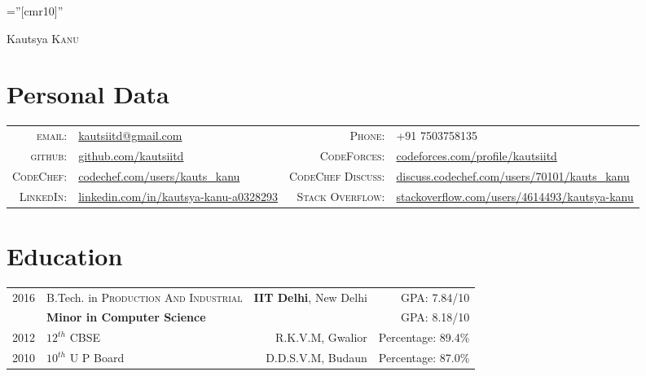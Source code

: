 \documentclass[a4paper,10pt]{article}
\begin{document}

\pagestyle{empty} %

\font\fb=''[cmr10]'' %

\par{
		{\Huge Kautsya \textsc{Kanu}
	}\bigskip\par}

\section{Personal Data}

\begin{tabular}{rl rl}
    \textsc{email:}     & \href{mailto:kautsiitd@gmail.com}{kautsiitd@gmail.com} & \textsc{Phone:}     & +91 7503758135\\
    \textsc{github:}     & \href{https://github.com/kautsiitd}{github.com/kautsiitd} & \textsc{CodeForces:}     & \href{http://codeforces.com/profile/kautsiitd}{codeforces.com/profile/kautsiitd}\\
     \textsc{CodeChef:}     & \href{https://www.codechef.com/users/kauts\_kanu}{codechef.com/users/kauts\_kanu} & \textsc{CodeChef Discuss:}     & \href{https://discuss.codechef.com/users/70101/kauts\_kanu}{discuss.codechef.com/users/70101/kauts\_kanu}\\
    \textsc{LinkedIn:}     & \href{https://www.linkedin.com/in/kautsya-kanu-a0328293}{linkedin.com/in/kautsya-kanu-a0328293} & \textsc{Stack Overflow:}     & \href{https://stackoverflow.com/users/4614493/kautsya-kanu?tab=profile}{stackoverflow.com/users/4614493/kautsya-kanu}\\
\end{tabular}

\section{Education}
\begin{tabular*}{\textwidth}{c @{\extracolsep{\fill}} lrr}	
 2016 & B.Tech. in \textsc{Production And Industrial} & \textbf{IIT Delhi}, New Delhi & GPA: 7.84/10\\
& \textbf{Minor in Computer Science} & & GPA: 8.18/10\\

2012 & $12^{th}$ CBSE & \textsc{R.K.V.M}, Gwalior & Percentage: 89.4\% \\

2010 & $10^{th}$ U P Board & \textsc{D.D.S.V.M}, Budaun & Percentage: 87.0\% \\
\end{tabular*}
\end{document}
